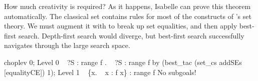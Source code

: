 How much creativity is required?  As it happens, Isabelle can prove this
theorem automatically.  The classical set  contains rules
for most of the constructs of \CHOL's set theory.  We must augment it with
 to break up set equalities, and then apply best-first
search.  Depth-first search would diverge, but best-first search
successfully navigates through the large search space.
\begin{ttbox}
choplev 0;
{\out Level 0}
{\out ~ ?S : range f}
{. ~ ?S : range f}
\ttbreak
by (best_tac (set_cs addSEs [equalityCE]) 1);
{\out Level 1}
{\out ~ \{x. ~ x : f x\} : range f}
{\out No subgoals!}
\end{ttbox}


